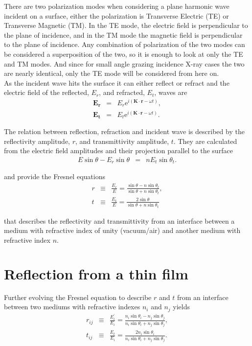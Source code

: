 There are two polarization modes when considering a plane harmonic wave incident on a surface, either the polarization is Transverse Electric (TE) or Transverse Magnetic (TM). In the TE mode, the electric field is perpendicular to the plane of incidence, and in the TM mode the magnetic field is perpendicular to the plane of incidence. Any combination of polarization of the two modes can be considered a superposition of the two, so it is enough to look at only the TE and TM modes. And since for small angle grazing incidence X-ray cases the two are nearly identical\cite{pedrotti:1993}, only the TE mode will be considered from here on. \\

As the incident wave hits the surface it can either reflect or refract and the electric field of the reflected, $E_r$, and refracted, $E_t$, waves are
\begin{eqnarray}
	\mathbf{E_r} & =  & E_r \mathrm{e}^{i(\mathbf{K}\cdot \mathbf{r}-\omega t)},\\
	\mathbf{E_t} & =  & E_t \mathrm{e}^{i(\mathbf{K}\cdot \mathbf{r}-\omega t)}.
\end{eqnarray}

The relation between reflection, refraction and incident wave is described by the reflectivity amplitude, $r$, and transmittivity amplitude, $t$. They are calculated from the electric field amplitudes and their projection parallel to the surface
\begin{eqnarray}
	E \sin{\theta} - E_r \sin{\theta} &=& n E_t \sin{\theta_t}.
\end{eqnarray}

and provide the Fresnel equations
\begin{eqnarray}\label{fresneleq}
	r & \equiv & \frac{E_r}{E} = \frac{\sin{\theta}-n \sin{\theta_t}}{\sin{\theta}+n \sin{\theta_t}}, \\
	t & \equiv & \frac{E_t}{E} = \frac{2\sin{\theta}}{\sin{\theta}+n \sin{\theta_t}}
\end{eqnarray}

that describes the reflectivity and transmittivity from an interface between a medium with refractive index of unity (vacuum/air) and another medium with refractive index $n$.

\section{Reflection from a thin film}
Further evolving the Fresnel equation to describe $r$ and $t$ from an interface between two mediums with refractive indexes $n_i$ and $n_j$ yields
\begin{eqnarray}
	r_{ij} & \equiv & \frac{E_i^{'}}{E_i} = \frac{n_i\sin{\theta_i}-n_j \sin{\theta_j}}{n_i\sin{\theta_i}+n_j \sin{\theta_j}}, \label{reflectivitetinterface}\\
	t_{ij} & \equiv & \frac{E_t}{E_i} = \frac{2 n_i\sin{\theta_i}}{n_i\sin{\theta_i}+n_j \sin{\theta_j}}.\label{transmittivity}
\end{eqnarray}

